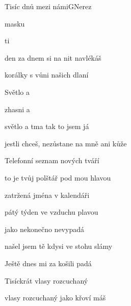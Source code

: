 \begin{song}{Tisíc dnů mezi námi}{G}{Nerez}

\begin{SBVerse}

  masku 

  ti 

den za dnem si na nit navlékáš

korálky s vůni našich dlaní

\end{SBVerse}

\begin{SBChorus*}

Světlo a  

zhasni a  

světlo a tma tak to jsem já

jestli chceš, nezůstane na mně ani kůže

\end{SBChorus*}

\begin{SBVerse}

Telefonní seznam nových tváří

to je tvůj polštář pod mou hlavou

zatržená jména v kalendáři

pátý týden ve vzduchu plavou

\end{SBVerse}

\begin{SBChorus*}

\end{SBChorus*}

\begin{SBChorus}

   

jako nekonečno nevypadá

našel jsem tě kdysi ve stohu slámy

Ještě dnes mi za košili padá

\end{SBChorus}

\begin{SBVerse}

Tisíckrát vlasy rozcuchaný

vlasy rozcuchaný jako křoví máš


\end{SBVerse}
\end{song}
